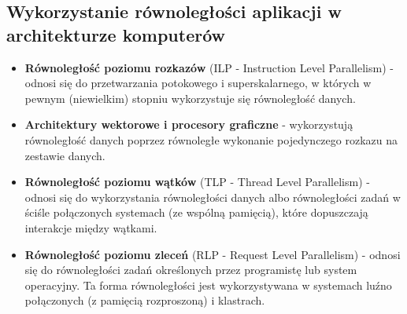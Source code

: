 	\subsection{Wykorzystanie równoległości aplikacji w architekturze komputerów}
		\begin{itemize}
			\item \textbf{Równoległość poziomu rozkazów} (ILP - Instruction Level Parallelism) - odnosi się do przetwarzania potokowego i superskalarnego, w których w pewnym (niewielkim) stopniu wykorzystuje się równoległość danych.
			\item \textbf{Architektury wektorowe i procesory graficzne} - wykorzystują równoległość danych poprzez równoległe wykonanie pojedynczego rozkazu na zestawie danych.
			\item \textbf{Równoległość poziomu wątków} (TLP - Thread Level Parallelism) - odnosi się do wykorzystania równoległości danych albo równoległości zadań w ściśle połączonych systemach (ze wspólną pamięcią), które dopuszczają interakcje między wątkami.
			\item \textbf{Równoległość poziomu zleceń} (RLP - Request Level Parallelism) - odnosi się do równoległości zadań określonych przez programistę lub system operacyjny. Ta forma równoległości jest wykorzystywana w systemach luźno połączonych (z pamięcią rozproszoną) i klastrach.
		\end{itemize}
	\vfill
